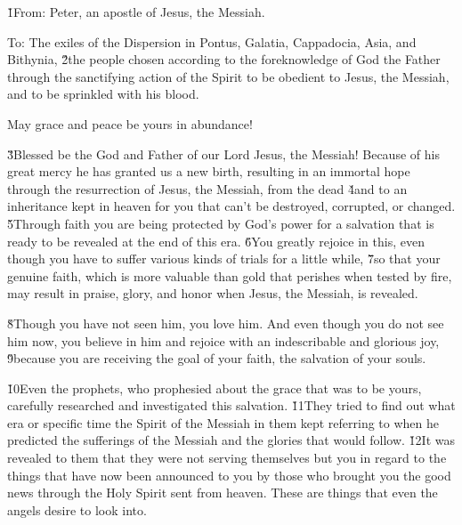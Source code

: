 


\v{1}From: Peter, an apostle of Jesus, the Messiah.

To: The exiles of the Dispersion in Pontus, Galatia, Cappadocia, Asia, and Bithynia, \v{2}the people chosen according to the foreknowledge of God the Father through the sanctifying action of the Spirit to be obedient to Jesus, the Messiah, and to be sprinkled with his blood.

May grace and peace be yours in abundance!

\v{3}Blessed be the God and Father of our Lord Jesus, the Messiah! Because of his great mercy he has granted us a new birth, resulting in an immortal hope through the resurrection of Jesus, the Messiah, from the dead \v{4}and to an inheritance kept in heaven for you that can't be destroyed, corrupted, or changed. \v{5}Through faith you are being protected by God's power for a salvation that is ready to be revealed at the end of this era. \v{6}You greatly rejoice in this, even though you have to suffer various kinds of trials for a little while, \v{7}so that your genuine faith, which is more valuable than gold that perishes when tested by fire, may result in praise, glory, and honor when Jesus, the Messiah, is revealed.

\v{8}Though you have not seen him, you love him. And even though you do not see him now, you believe in him and rejoice with an indescribable and glorious joy, \v{9}because you are receiving the goal of your faith, the salvation of your souls.

\v{10}Even the prophets, who prophesied about the grace that was to be yours, carefully researched and investigated this salvation. \v{11}They tried to find out what era or specific time the Spirit of the Messiah in them kept referring to when he predicted the sufferings of the Messiah and the glories that would follow. \v{12}It was revealed to them that they were not serving themselves but you in regard to the things that have now been announced to you by those who brought you the good news through the Holy Spirit sent from heaven. These are things that even the angels desire to look into.

